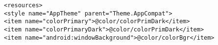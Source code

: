 \begin{lstlisting}[title=Android/app/src/main/res/values/styles.xml]
<resources>
<style name="AppTheme" parent="Theme.AppCompat">
<item name="colorPrimary">@color/colorPrimDark</item>
<item name="colorPrimaryDark">@color/colorPrimDark</item>
<item name="android:windowBackground">@color/colorBgr</item>
\end{lstlisting}

\secup
